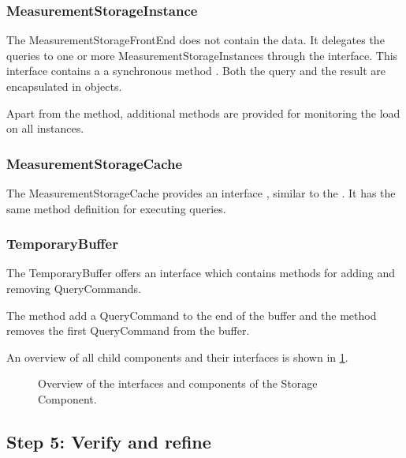 \subsubsection{MeasurementStorageInstance}

\npar The MeasurementStorageFrontEnd does not contain the data. It delegates
the queries to one or more MeasurementStorageInstances through the
 interface. This interface contains a
a synchronous method . Both the query and the
result are encapsulated in objects.

\npar Apart from the  method, additional methods are provided
for monitoring the load on all instances.

\subsubsection{MeasurementStorageCache}

\npar The MeasurementStorageCache provides an interface
, similar to the
. It has the same method definition for
executing queries. 

\subsubsection{TemporaryBuffer}

\npar The TemporaryBuffer offers an  interface
which contains methods for adding and removing QueryCommands. 

\npar The method  add a QueryCommand to the end
of the buffer and the method  removes the first
QueryCommand from the buffer.

\npar An overview of all child components and their interfaces is shown in
\ref{fig:it4/interfaces}.

\begin{figure}[H]
	\begin{centering}
		\caption{Overview of the interfaces and components of the Storage Component.}
		\label{fig:it4/interfaces}
	\end{centering}
\end{figure}

\subsection{Step 5: Verify and refine}
\label{add:it4/verification}

